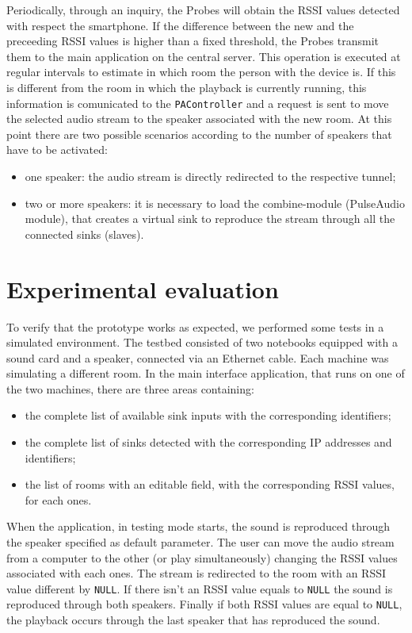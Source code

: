 \documentclass[conference]{IEEEtran}
\begin{document}
Periodically, through an inquiry, the Probes will obtain the RSSI values detected with respect the smartphone. If the difference between the new and the preceeding RSSI values is higher than a fixed threshold, the Probes transmit them to the main application on the central server. This operation is executed at regular intervals to estimate in which room the person with the device is. If this is different from the room in which the playback is currently running, this information is comunicated to the \texttt{PAController} and a request is sent to move the selected audio stream to the speaker associated with the new room. At this point there are two possible scenarios according to the number of speakers that have to be activated:
\begin{itemize}
	\item one speaker: the audio stream is directly redirected to the respective tunnel;
	\item two or more speakers: it is necessary to load the combine-module (PulseAudio module), that creates a virtual sink to reproduce the stream through all the connected sinks (slaves).
\end{itemize}

\section{Experimental evaluation}
To verify that the prototype works as expected, we performed some tests in a simulated environment. The testbed consisted of two notebooks equipped with a sound card and a speaker, connected via an Ethernet cable. Each machine was simulating a different room. In the main interface application, that runs on one of the two machines, there are three areas containing:
\begin{itemize}
	\item the complete list of available sink inputs with the corresponding identifiers;
	\item the complete list of sinks detected with the corresponding IP addresses and identifiers;
	\item the list of rooms with an editable field, with the corresponding RSSI values, for each ones.
\end{itemize}

When the application, in testing mode starts, the sound is reproduced through the speaker specified as default parameter. The user can move the audio stream from a computer to the other (or play simultaneously) changing the RSSI values associated with each ones. The stream is redirected to the room with an RSSI value different by \texttt{NULL}. If there isn't an RSSI value equals to \texttt{NULL} the sound is reproduced through both speakers. Finally if both RSSI values are equal to \texttt{NULL}, the playback occurs through the last speaker that has reproduced the sound.
\end{document}
